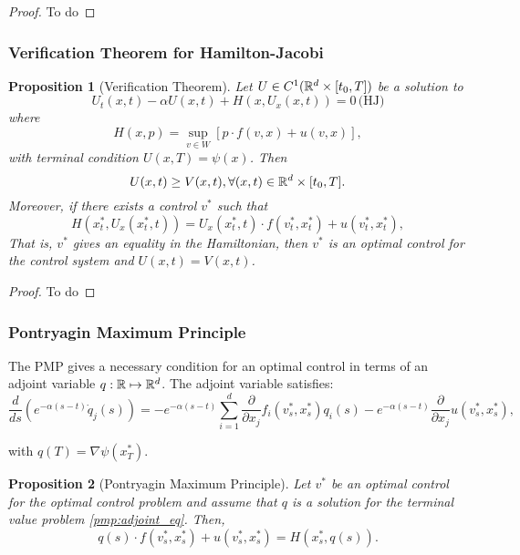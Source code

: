 \documentclass{article}
\newtheorem{proposition}{Proposition}
\begin{document}
\begin{proof}
    To do
\end{proof}

\subsubsection{Verification Theorem for Hamilton-Jacobi}
\begin{proposition}[Verification Theorem]
    Let $U \in C^1(\mathbb{R}^d \times [t_0, T])$ be a solution to 
    $$
    U_t(x,t) - \alpha U(x,t) + H(x, U_x(x,t)) = 0\, \text{(HJ)}
    $$
    where 
    $$
    H(x,p) = \sup_{v \in W} [p \cdot f(v,x) + u(v,x)],
    $$
    with terminal condition $U(x,T) = \psi(x)$. Then
    $$U(x,t) \geq V(x,t), \forall (x,t) \in \mathbb{R}^d \times [t_0,T].$$
    Moreover, if there exists a control $v^*$ such that
    $$
    H(x^*_t, U_x (x^*_t, t)) = U_x(x^*_t, t)\cdot f(v^*_t, x^*_t) + u(v^*_t, x^*_t),
    $$
    That is, $v^*$ gives an equality in the Hamiltonian, then $v^*$ is an optimal control for the control system and $U(x,t) = V(x,t)$.
\end{proposition}

\begin{proof}
    To do
\end{proof}

\subsubsection{Pontryagin Maximum Principle}

The PMP gives a necessary condition for an optimal control in terms of an adjoint variable $q: \mathbb{R} \mapsto \mathbb{R}^d$. The adjoint variable satisfies:
\begin{equation}\label{pmp:adjoint_eq}
    \frac{d}{ds} \left( e^{-\alpha(s-t)} {\dot q}_j(s) \right) = -e^{-\alpha (s - t)} \sum_{i = 1}^d \frac{\partial}{\partial x_j} f_i (v^*_s, x^*_s) q_i(s) - e^{-\alpha (s - t)} \frac{\partial}{\partial x_j} u(v^*_s, x^*_s),
\end{equation}

with $q(T) = \nabla \psi(x^*_T)$.

\begin{proposition}[Pontryagin Maximum Principle]
    Let $v^*$ be an optimal control for the optimal control problem and assume that $q$ is a solution for the terminal value problem \eqref{pmp:adjoint_eq}. Then,
    \begin{equation}\label{pmp:transversality_condition}
    q(s) \cdot f(v^*_s, x^*_s) + u(v^*_s, x^*_s) = H(x^*_s, q(s)).
    \end{equation}
\end{proposition}
\end{document}
